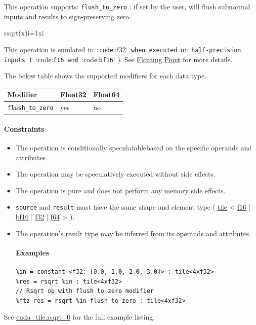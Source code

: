 \documentclass{article}
\begin{document}
This operation supports: \texttt{flush\_to\_zero} : if set by the user, will flush subnormal inputs and results to sign-preserving zero.


rsqrt(x)i=1xi

This operation is emulated in \texttt{:code:}f32`\texttt{ when executed on half-precision inputs ( }:code:\texttt{f16}\texttt{ and }:code:\texttt{bf16}` ). See \href{https://docs.nvidia.com/cuda/tile-ir/latest/sections/operations.html#op-group-floating-point}{Floating Point} for more details.


The below table shows the supported modifiers for each data type.


\begin{longtable}{l|l|l}
\hline
Modifier & Float32 & Float64 \\ \hline
\texttt{flush\_to\_zero} & yes & no \\ \hline
\end{longtable}


\paragraph{Constraints}

\begin{itemize}
\item The operation is conditionally speculatablebased on the specific operands and attributes.
\item The operation may be speculatively executed without side effects.
\item The operation is pure and does not perform any memory side effects.
\item \texttt{source} and \texttt{result} must have the same shape and element type ( \href{https://docs.nvidia.com/cuda/tile-ir/latest/sections/types.html#type-tile}{tile} < \href{https://docs.nvidia.com/cuda/tile-ir/latest/sections/types.html#subsection-element-types}{f16} | \href{https://docs.nvidia.com/cuda/tile-ir/latest/sections/types.html#subsection-element-types}{bf16} | \href{https://docs.nvidia.com/cuda/tile-ir/latest/sections/types.html#subsection-element-types}{f32} | \href{https://docs.nvidia.com/cuda/tile-ir/latest/sections/types.html#subsection-element-types}{f64} > ).
\item The operation's result type may be inferred from its operands and attributes.


\paragraph{Examples}

\begin{lstlisting}
%in = constant <f32: [0.0, 1.0, 2.0, 3.0]> : tile<4xf32>
%res = rsqrt %in : tile<4xf32>
// Rsqrt op with flush to zero modifier
%ftz_res = rsqrt %in flush_to_zero : tile<4xf32>
\end{lstlisting}

\end{itemize}
See \href{https://docs.nvidia.com/cuda/tile-ir/latest/sections/appendix.html#example-cuda-tile-rsqrt-0}{cuda\_tile.rsqrt\_0} for the full example listing.
\end{document}
